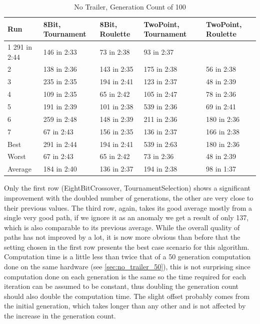 \begin{table}[H]\caption{No Trailer, Generation Count of 100}
\begin{center}
	\begin{tabular}{| l | l | l | p{3cm} | p{3cm}|}
		\hline
		Run 		& 8Bit, Tournament 	& 8Bit, Roulette 	& TwoPoint, Tournament 	& TwoPoint, Roulette	\\ \hline
		1				291 in 2:44					&	146 in 2:33			&	73 in 2:38						&	93 in 2:37					\\ \hline
		2				&	138 in 2:36				&	143 in 2:35			&	175 in 2:38						&	56 in 2:38					\\ \hline
		3				&	235 in 2:35				&	194 in 2:41			&	123 in 2:37						&	48 in 2:39					\\ \hline
		4				&	109 in 2:35				&	65 in 2:42			&	105 in 2:47						&	78 in 2:36					\\ \hline
		5				&	191 in 2:39				&	101 in 2:38			&	539 in 2:36						&	69 in 2:41					\\ \hline
		6				&	259 in 2:48				&	148 in 2:39			&	211 in 2:36						&	180 in 2:36					\\ \hline
		7				&	67 in 2:43				&	156 in 2:35			&	136 in 2:37						&	166 in 2:38					\\ \hline
		Best		&	291 in 2:44				&	194 in 2:41			&	539 in 2:63						&	180 in 2:36					\\ \hline
		Worst		&	67 in 2:43				&	65 in 2:42			&	73 in 2:36						& 48 in 2:39					\\ \hline
		Average	&	184 in 2:40				& 136 in 2:37			& 194 in 2:38						&	98 in 1:37					\\ \hline
		\hline
	\end{tabular}
\end{center}
\end{table}

Only the first row (EightBitCrossover, TournamentSelection) shows a significant improvement with the doubled number of generations, the other are very close to their previous values. The third row, again, takes its good average mostly from a single very good path, if we ignore it as an anomaly we get a result of only 137, which is also comparable to its previous average. While the overall quality of paths has not improved by a lot, it is now more obvious than before that the setting chosen in the first row presents the best case scenario for this algorithm. Computation time is a little less than twice that of a 50 generation computation done on the same hardware (see \ref{sec:no_trailer_50}), this is not surprising since computation done on each generation is the same so the time required for each iteration can be assumed to be constant, thus doubling the generation count should also double the computation time. The slight offset probably comes from the initial generation, which takes longer than any other and is not affected by the increase in the generation count.

